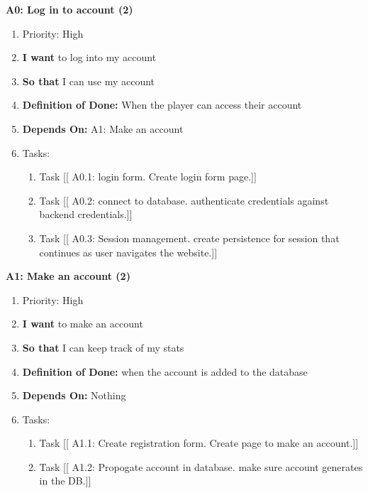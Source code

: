 \textbf{A0: Log in to account (2)}
\begin{enumerate}
    \item Priority: High
    \item \textbf{I want} to log into my account
    \item \textbf{So that} I can use my account
    \item \textbf{Definition of Done:} When the player can access their account
    \item \textbf{Depends On:} A1: Make an account
    \item Tasks:
    \begin{enumerate}
        \item Task [[ A0.1: login form. Create login form page.]]
        \item Task [[ A0.2: connect to database. authenticate credentials against backend credentials.]]
        \item Task [[ A0.3: Session management. create persistence for session that continues as user navigates the website.]]
    \end{enumerate}
\end{enumerate}

\vspace{2em}

\textbf{A1: Make an account (2)}
\begin{enumerate}
    \item Priority: High
    \item \textbf{I want} to make an account
    \item \textbf{So that} I can keep track of my stats
    \item \textbf{Definition of Done:} when the account is added to the database
    \item \textbf{Depends On:} Nothing
    \item Tasks:
    \begin{enumerate}
        \item Task [[ A1.1: Create registration form. Create page to make an account.]]
        \item Task [[ A1.2: Propogate account in database. make sure account generates in the DB.]]
    \end{enumerate}
\end{enumerate}

\vspace{2em}

